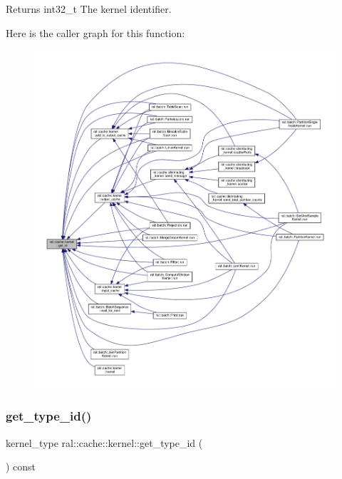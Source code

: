 \begin{DoxyReturn}{Returns}
int32\+\_\+t The kernel identifier. 
\end{DoxyReturn}
Here is the caller graph for this function\+:\nopagebreak
\begin{figure}[H]
\begin{center}
\leavevmode
\includegraphics[width=350pt]{classral_1_1cache_1_1kernel_a33ce6e9907abce1acedb01e236c6812e_icgraph}
\end{center}
\end{figure}
\mbox{\label{classral_1_1cache_1_1kernel_a146246668880ca685f22d208e638578b}} 
\subsubsection{\texorpdfstring{get\+\_\+type\+\_\+id()}{get\_type\_id()}}
{\footnotesize\ttfamily kernel\+\_\+type ral\+::cache\+::kernel\+::get\+\_\+type\+\_\+id (\begin{DoxyParamCaption}{ }\end{DoxyParamCaption}) const\hspace{0.3cm}{\ttfamily [inline]}}



